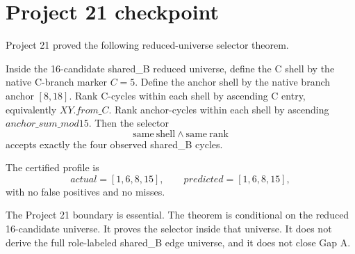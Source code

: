 \section{Project 21 checkpoint}

Project 21 proved the following reduced-universe selector theorem.

\begin{theorem}
Inside the 16-candidate shared\_B reduced universe, define the C shell by the native C-branch marker \(C=5\).  Define the anchor shell by the native branch anchor \([8,18]\).  Rank C-cycles within each shell by ascending C entry, equivalently \(XY.from\_C\).  Rank anchor-cycles within each shell by ascending \(anchor\_sum\_mod15\).  Then the selector
\[
    \mathrm{same\ shell} \wedge \mathrm{same\ rank}
\]
accepts exactly the four observed shared\_B cycles.
\end{theorem}

The certified profile is
\[
    actual = [1,6,8,15],
    \qquad
    predicted = [1,6,8,15],
\]
with no false positives and no misses.

The Project 21 boundary is essential.  The theorem is conditional on the reduced 16-candidate universe.  It proves the selector inside that universe.  It does not derive the full role-labeled shared\_B edge universe, and it does not close Gap A.
